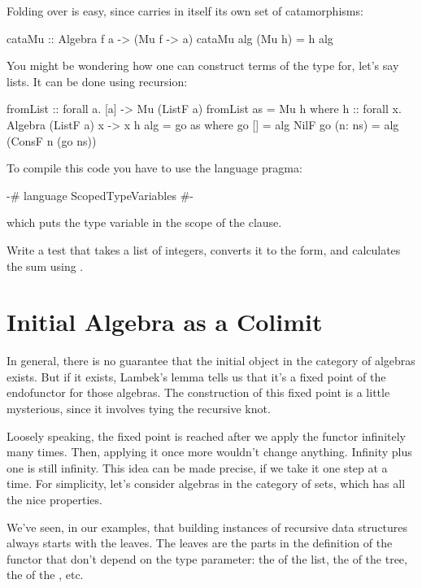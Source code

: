 \documentclass[DaoFP]{subfiles}
\begin{document}
Folding over  is easy, since  carries in itself its own set of catamorphisms:
\begin{haskell}
cataMu :: Algebra f a -> (Mu f -> a)
cataMu alg (Mu h) = h alg
\end{haskell}

You might be wondering how one can construct terms of the type  for, let's say lists. It can be done using recursion:
\begin{haskell}
fromList :: forall a. [a] -> Mu (ListF a)
fromList as = Mu h
  where h :: forall x. Algebra (ListF a) x -> x
        h alg = go as
          where
            go [] = alg NilF
            go (n: ns) = alg (ConsF n (go ns))
\end{haskell}
To compile this code you have to use the language pragma:
\begin{haskell}
{-# language ScopedTypeVariables #-}
\end{haskell}
which puts the type variable  in the scope of the  clause.

\begin{exercise}
Write a test that takes a list of integers, converts it to the  form, and calculates the sum using .
\end{exercise}


\section{Initial Algebra as a Colimit}

In general, there is no guarantee that the initial object in the category of algebras exists. But if it exists, Lambek's lemma tells us that it's a fixed point of the endofunctor for those algebras.  The construction of this fixed point is a little mysterious, since it involves tying the recursive knot. 

Loosely speaking, the fixed point is reached after we apply the functor infinitely many times. Then, applying it once more wouldn't change anything. Infinity plus one is still infinity. This idea can be made precise, if we take it one step at a time. For simplicity, let's consider algebras in the category of sets, which has all the nice properties.

We've seen, in our examples, that building instances of recursive data structures always starts with the leaves. The leaves are the parts in the definition of the functor that don't depend on the type parameter: the  of the list, the  of the tree, the  of the , etc. 
\end{document}
